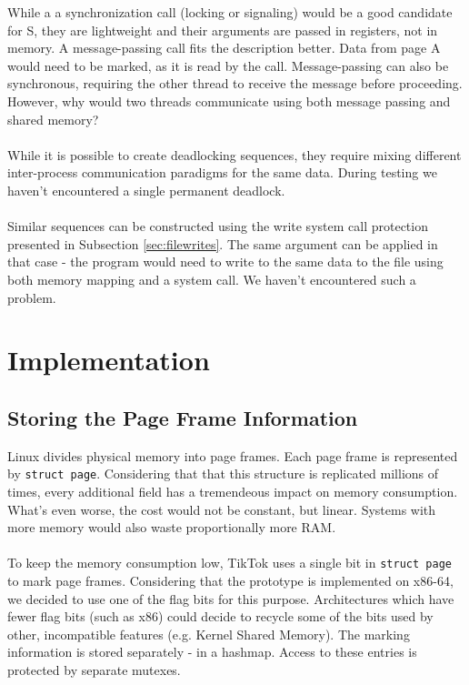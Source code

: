 \documentclass[conference]{IEEEtran}
\begin{document}
While a a synchronization call (locking or signaling) would be a good candidate for S, they are lightweight and their arguments
are passed in registers, not in memory. A message-passing call fits the description better. Data from page A would need to be marked,
as it is read by the call. Message-passing can also be synchronous, requiring the other thread to receive the message before proceeding.
However, why would two threads communicate using both message passing and shared memory?
\\
\\
While it is possible to create deadlocking sequences, they require mixing different inter-process communication
paradigms for the same data. During testing we haven't encountered a single permanent deadlock.
\\
\\
Similar sequences can be constructed using the write system call protection presented in Subsection \ref{sec:filewrites}. The same argument
can be applied in that case - the program would need to write to the same data to the file using both memory mapping and a system call. We
haven't encountered such a problem.


\section{Implementation}

\subsection{Storing the Page Frame Information}

Linux divides physical memory into page frames. Each page frame is represented by \texttt{struct page}. Considering that that this structure
is replicated millions of times, every additional field has a tremendeous impact on memory consumption. What's even worse, the cost would not
be constant, but linear. Systems with more memory would also waste proportionally more RAM.
\\
\\
To keep the memory consumption low, TikTok uses a single bit in \texttt{struct page} to mark page frames. Considering that the prototype is implemented on x86-64,
we decided to use one of the flag bits for this purpose. Architectures which have fewer flag bits (such as x86) could decide to recycle some of
the bits used by other, incompatible features (e.g. Kernel Shared Memory). The marking information is stored separately - in a hashmap.
Access to these entries is protected by separate mutexes.
\end{document}
